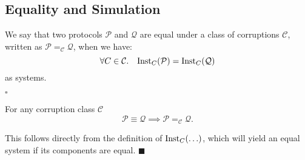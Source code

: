 \subsection{Equality and Simulation}

\begin{definition}
  We say that two protocols $\mathcal{P}$ and $\mathcal{Q}$
  are equal under a class of corruptions $\mathcal{C}$,
  written as $\mathcal{P} =_{\mathcal{C}} \mathcal{Q}$, when we have:
  $$
  \forall C \in \mathcal{C}.\quad \text{Inst}_C(\mathcal{P}) = \text{Inst}_C(\mathcal{Q})
  $$
  as systems.

  $\square$

\end{definition}

\begin{lemma}
For any corruption class $\mathcal{C}$
$$
\mathcal{P} \equiv \mathcal{Q} \implies \mathcal{P} =_\mathcal{C} \mathcal{Q}.
$$

 This follows directly from the definition of $\text{Inst}_C(\ldots)$,
which will yield an equal system if its components are equal. $\blacksquare$
\end{lemma}
